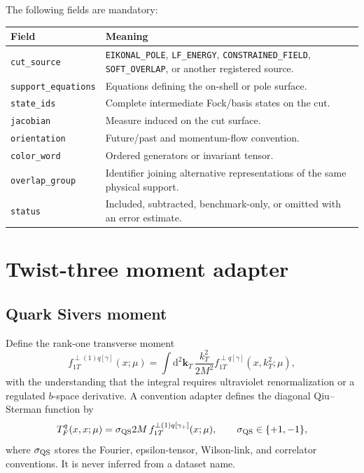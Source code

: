 \documentclass[11pt]{article}
\newcommand{\kT}{\bm{k}_{T}}
\newcommand{\dd}{\mathrm{d}}
\begin{document}
The following fields are mandatory:
\begin{longtable}{L{0.28\textwidth}L{0.62\textwidth}}
\toprule
Field & Meaning\\
\midrule
\endhead
\texttt{cut\_source} & \texttt{EIKONAL\_POLE},
\texttt{LF\_ENERGY}, \texttt{CONSTRAINED\_FIELD},
\texttt{SOFT\_OVERLAP}, or another registered source.\\
\texttt{support\_equations} & Equations defining the on-shell or pole
surface.\\
\texttt{state\_ids} & Complete intermediate Fock/basis states on the cut.\\
\texttt{jacobian} & Measure induced on the cut surface.\\
\texttt{orientation} & Future/past and momentum-flow convention.\\
\texttt{color\_word} & Ordered generators or invariant tensor.\\
\texttt{overlap\_group} & Identifier joining alternative representations of
the same physical support.\\
\texttt{status} & Included, subtracted, benchmark-only, or omitted with an
error estimate.\\
\bottomrule
\end{longtable}

\section{Twist-three moment adapter}
\label{app:twist3}

\subsection{Quark Sivers moment}

Define the rank-one transverse moment
\begin{equation}
 f_{1T}^{\perp(1)q[\gamma]}(x;\mu)
 =\int\dd^2\kT\,
 \frac{k_T^2}{2M^2}
 f_{1T}^{\perp q[\gamma]}(x,k_T^2;\mu),
\label{eq:sivers-first-moment}
\end{equation}
with the understanding that the integral requires ultraviolet
renormalization or a regulated \(b\)-space derivative.  A convention adapter
defines the diagonal Qiu--Sterman function by
\begin{equation}
 T_F^q(x,x;\mu)
 =\sigma_{\rm QS}
  2M\,f_{1T}^{\perp(1)q[\gamma_+]}(x;\mu),
\qquad
 \sigma_{\rm QS}\in\{+1,-1\},
\label{eq:qiu-sterman-adapter}
\end{equation}
where \(\sigma_{\rm QS}\) stores the Fourier, epsilon-tensor, Wilson-link,
and correlator conventions.  It is never inferred from a dataset name.
\end{document}
